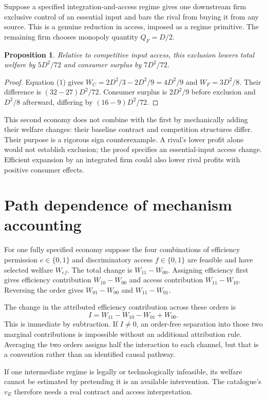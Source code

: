 \documentclass[11pt,a4paper]{article}
\newtheorem{proposition}[theorem]{Proposition}
\begin{document}
Suppose a specified integration-and-access regime gives one downstream firm exclusive control of an essential input and bars the rival from buying it from any source. This is a genuine reduction in access, imposed as a regime primitive. The remaining firm chooses monopoly quantity $Q_F=D/2$.
\begin{proposition}
Relative to competitive input access, this exclusion lowers total welfare by $5D^2/72$ and consumer surplus by $7D^2/72$.
\end{proposition}
\begin{proof}
Equation (1) gives $W_C=2D^2/3-2D^2/9=4D^2/9$ and $W_F=3D^2/8$. Their difference is $(32-27)D^2/72$. Consumer surplus is $2D^2/9$ before exclusion and $D^2/8$ afterward, differing by $(16-9)D^2/72$.
\end{proof}
This second economy does not combine with the first by mechanically adding their welfare changes: their baseline contract and competition structures differ. Their purpose is a rigorous sign counterexample. A rival's lower profit alone would not establish exclusion; the proof specifies an essential-input access change. Efficient expansion by an integrated firm could also lower rival profits with positive consumer effects.
\section{Path dependence of mechanism accounting}
For one fully specified economy suppose the four combinations of efficiency permission $e\in\{0,1\}$ and discriminatory access $f\in\{0,1\}$ are feasible and have selected welfare $W_{ef}$. The total change is $W_{11}-W_{00}$. Assigning efficiency first gives efficiency contribution $W_{10}-W_{00}$ and access contribution $W_{11}-W_{10}$. Reversing the order gives $W_{01}-W_{00}$ and $W_{11}-W_{01}$.

The change in the attributed efficiency contribution across these orders is
\[
 I=W_{11}-W_{10}-W_{01}+W_{00}.
\]
This is immediate by subtraction. If $I\ne0$, an order-free separation into those two marginal contributions is impossible without an additional attribution rule. Averaging the two orders assigns half the interaction to each channel, but that is a convention rather than an identified causal pathway.

If one intermediate regime is legally or technologically infeasible, its welfare cannot be estimated by pretending it is an available intervention. The catalogue's $v_E$ therefore needs a real contract and access interpretation.
\end{document}
